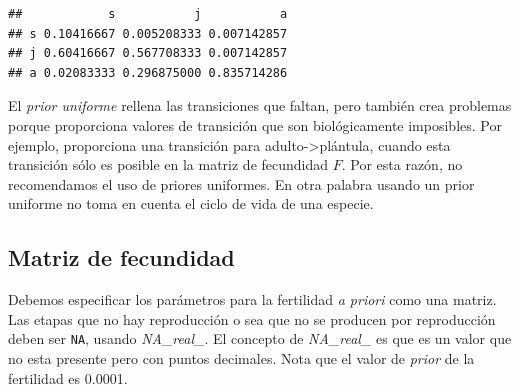 \documentclass[
]{book}
\newenvironment{Shaded}{\begin{snugshade}}{\end{snugshade}}
\newcommand{\CommentTok}[1]{\textcolor[rgb]{0.56,0.35,0.01}{\textit{#1}}}
\newcommand{\DecValTok}[1]{\textcolor[rgb]{0.00,0.00,0.81}{#1}}
\newcommand{\FloatTok}[1]{\textcolor[rgb]{0.00,0.00,0.81}{#1}}
\newcommand{\FunctionTok}[1]{\textcolor[rgb]{0.13,0.29,0.53}{\textbf{#1}}}
\newcommand{\NormalTok}[1]{#1}
\newcommand{\OtherTok}[1]{\textcolor[rgb]{0.56,0.35,0.01}{#1}}
\newcommand{\SpecialCharTok}[1]{\textcolor[rgb]{0.81,0.36,0.00}{\textbf{#1}}}
\newcommand{\StringTok}[1]{\textcolor[rgb]{0.31,0.60,0.02}{#1}}
\theoremstyle{definition}
\theoremstyle{definition}
\theoremstyle{definition}
\theoremstyle{definition}
\theoremstyle{remark}
\begin{document}
\begin{Shaded}
\end{Shaded}

\begin{verbatim}
##            s           j           a
## s 0.10416667 0.005208333 0.007142857
## j 0.60416667 0.567708333 0.007142857
## a 0.02083333 0.296875000 0.835714286
\end{verbatim}

El \emph{prior uniforme} rellena las transiciones que faltan, pero también
crea problemas porque proporciona valores de transición que son
biológicamente imposibles. Por ejemplo, proporciona una transición para
adulto-\textgreater plántula, cuando esta transición sólo es posible en la matriz
de fecundidad \(F\). Por esta razón, no recomendamos el uso de priores
uniformes. En otra palabra usando un prior uniforme no toma en cuenta el
ciclo de vida de una especie.

\hypertarget{matriz-de-fecundidad}{%
\subsection{Matriz de fecundidad}\label{matriz-de-fecundidad}}

Debemos especificar los parámetros para la fertilidad \emph{a priori} como
una matriz. Las etapas que no hay reproducción o sea que no se producen
por reproducción deben ser \texttt{NA}, usando \emph{NA\_real\_}. El concepto de
\emph{NA\_real\_} es que es un valor que no esta presente pero con puntos
decimales. Nota que el valor de \emph{prior} de la fertilidad es 0.0001.
\end{document}
